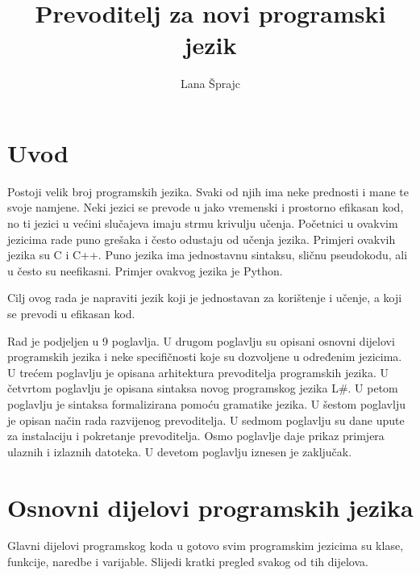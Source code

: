 \documentclass[times, utf8, zavrsni]{fer}
\begin{document}

\title{Prevoditelj za novi programski jezik}

\author{Lana Šprajc}

\maketitle


\zahvala{}

\tableofcontents

\chapter{Uvod}
Postoji velik broj programskih jezika. Svaki od njih ima neke prednosti i mane te svoje namjene.
Neki jezici se prevode u jako vremenski i prostorno efikasan kod, no ti jezici u većini slučajeva imaju strmu krivulju učenja. Početnici u ovakvim jezicima
rade puno grešaka i često odustaju od učenja jezika. Primjeri ovakvih jezika su C i C++. Puno jezika ima jednostavnu sintaksu, sličnu pseudokodu, ali
u često su neefikasni. Primjer ovakvog jezika je Python.

Cilj ovog rada je napraviti jezik koji je jednostavan za korištenje i učenje, a koji se prevodi u efikasan kod.

Rad je podjeljen u 9 poglavlja. U drugom poglavlju su opisani osnovni dijelovi programskih jezika i neke specifičnosti koje su dozvoljene u određenim jezicima.
U trećem poglavlju je opisana arhitektura prevoditelja programskih jezika. U četvrtom poglavlju je opisana sintaksa novog programskog jezika L\#. U petom poglavlju
je sintaksa formalizirana pomoću gramatike jezika. U šestom poglavlju je opisan način rada razvijenog prevoditelja. U sedmom poglavlju su dane upute za instalaciju
i pokretanje prevoditelja. Osmo poglavlje daje prikaz primjera ulaznih i izlaznih datoteka. U devetom poglavlju iznesen je zaključak.

\chapter{Osnovni dijelovi programskih jezika}
Glavni dijelovi programskog koda u gotovo svim programskim jezicima su klase, funkcije, naredbe i varijable. Slijedi kratki pregled svakog od tih dijelova.
\end{document}
